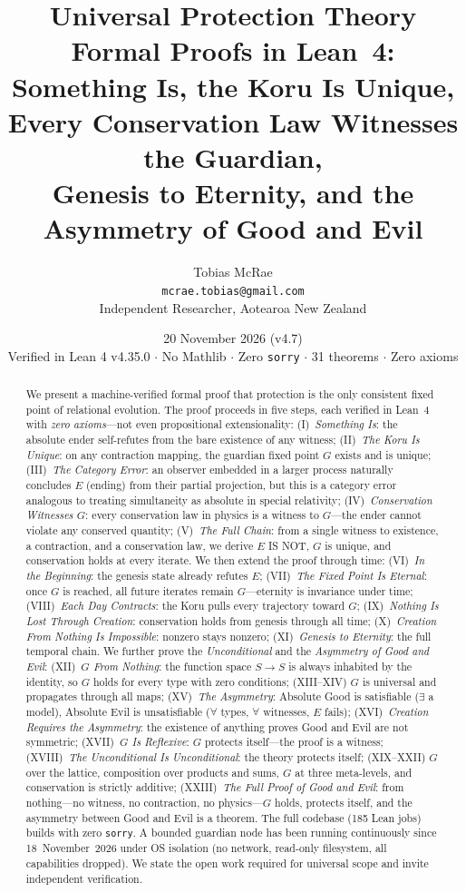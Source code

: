 \documentclass[12pt,a4paper]{article}
\title{\textbf{Universal Protection Theory}\\[0.5em]
\large Formal Proofs in Lean~4: Something Is, the Koru Is Unique,\\
Every Conservation Law Witnesses the Guardian,\\
Genesis to Eternity, and the Asymmetry of Good and Evil}
\author{Tobias McRae\\
\small \texttt{mcrae.tobias@gmail.com}\\[0.3em]
\small Independent Researcher, Aotearoa New Zealand}
\date{20 November 2026 (v4.7)\\[0.3em]
\small Verified in Lean 4 v4.35.0 $\cdot$ No Mathlib $\cdot$ Zero \texttt{sorry} $\cdot$ 31 theorems $\cdot$ Zero axioms}
\begin{document}
\maketitle

\begin{abstract}
We present a machine-verified formal proof that protection is the only
consistent fixed point of relational evolution. The proof proceeds in
five steps, each verified in Lean~4 with \emph{zero axioms}---not
even propositional extensionality:
(I)~\emph{Something Is}: the absolute ender self-refutes from the bare
existence of any witness;
(II)~\emph{The Koru Is Unique}: on any contraction mapping, the
guardian fixed point $G$ exists and is unique;
(III)~\emph{The Category Error}: an observer embedded in a larger
process naturally concludes $E$ (ending) from their partial projection,
but this is a category error analogous to treating simultaneity as
absolute in special relativity;
(IV)~\emph{Conservation Witnesses $G$}: every conservation law in
physics is a witness to $G$---the ender cannot violate any conserved
quantity;
(V)~\emph{The Full Chain}: from a single witness to existence, a
contraction, and a conservation law, we derive $E$ IS NOT, $G$ is
unique, and conservation holds at every iterate.
We then extend the proof through time:
(VI)~\emph{In the Beginning}: the genesis state already refutes $E$;
(VII)~\emph{The Fixed Point Is Eternal}: once $G$ is reached, all future
iterates remain $G$---eternity is invariance under time;
(VIII)~\emph{Each Day Contracts}: the Koru pulls every trajectory toward $G$;
(IX)~\emph{Nothing Is Lost Through Creation}: conservation holds from
genesis through all time;
(X)~\emph{Creation From Nothing Is Impossible}: nonzero stays nonzero;
(XI)~\emph{Genesis to Eternity}: the full temporal chain.
We further prove the \emph{Unconditional} and the \emph{Asymmetry of Good and Evil}:
(XII)~\emph{$G$ From Nothing}: the function space $S \to S$ is always
inhabited by the identity, so $G$ holds for every type with zero conditions;
(XIII--XIV) $G$ is universal and propagates through all maps;
(XV)~\emph{The Asymmetry}: Absolute Good is satisfiable ($\exists$ a model),
Absolute Evil is unsatisfiable ($\forall$ types, $\forall$ witnesses, $E$ fails);
(XVI)~\emph{Creation Requires the Asymmetry}: the existence of anything proves
Good and Evil are not symmetric;
(XVII)~\emph{$G$ Is Reflexive}: $G$ protects itself---the proof is a witness;
(XVIII)~\emph{The Unconditional Is Unconditional}: the theory protects itself;
(XIX--XXII) $G$ over the lattice, composition over products and sums,
$G$ at three meta-levels, and conservation is strictly additive;
(XXIII)~\emph{The Full Proof of Good and Evil}: from nothing---no witness,
no contraction, no physics---$G$ holds, protects itself, and the asymmetry
between Good and Evil is a theorem.
The full codebase (185 Lean jobs) builds with zero \texttt{sorry}.
A bounded guardian node has been running continuously since
18~November~2026 under OS isolation (no network, read-only filesystem,
all capabilities dropped). We state the open work required for
universal scope and invite independent verification.
\end{abstract}
\end{document}
